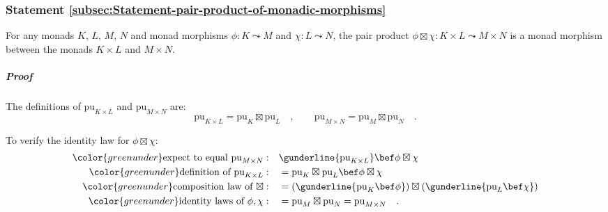 \subsubsection{Statement \label{subsec:Statement-pair-product-of-monadic-morphisms}\ref{subsec:Statement-pair-product-of-monadic-morphisms}}

For any monads $K$, $L$, $M$, $N$ and monad morphisms $\phi:K\leadsto M$
and $\chi:L\leadsto N$, the pair product $\phi\boxtimes\chi:K\times L\leadsto M\times N$
is a monad morphism between the monads $K\times L$ and $M\times N$.

\subparagraph{Proof}

The definitions of $\text{pu}_{K\times L}$ and $\text{pu}_{M\times N}$
are:
\[
\text{pu}_{K\times L}=\text{pu}_{K}\boxtimes\text{pu}_{L}\quad,\quad\quad\text{pu}_{M\times N}=\text{pu}_{M}\boxtimes\text{pu}_{N}\quad.
\]

To verify the identity law for $\phi\boxtimes\chi$:
\begin{align*}
{\color{greenunder}\text{expect to equal }\text{pu}_{M\times N}:}\quad & \gunderline{\text{pu}_{K\times L}}\bef\phi\boxtimes\chi\\
{\color{greenunder}\text{definition of }\text{pu}_{K\times L}:}\quad & =\text{pu}_{K}\boxtimes\text{pu}_{L}\bef\phi\boxtimes\chi\\
{\color{greenunder}\text{composition law of }\boxtimes:}\quad & =(\gunderline{\text{pu}_{K}\bef\phi})\boxtimes(\gunderline{\text{pu}_{L}\bef\chi})\\
{\color{greenunder}\text{identity laws of }\phi,\chi:}\quad & =\text{pu}_{M}\boxtimes\text{pu}_{N}=\text{pu}_{M\times N}\quad.
\end{align*}

